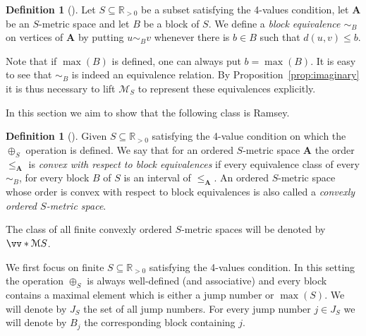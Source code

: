 \documentclass{elsarticle}
\def\ordclasssup#1#2{\vv*{#1}{#2}}
\def\str#1{\mathbf {#1}}
\theoremstyle{plain}
\theoremstyle{definition}
\newtheorem{definition}[theorem]{Definition}
\theoremstyle{remark}
\begin{document}
\begin{definition}[\cite{Sauer2012}]
Let $S\subseteq \mathbb R_{>0}$ be a subset satisfying the 4-values condition, let $\str{A}$ be an $S$-metric space and let $B$ be a block of $S$. We define a \emph{block equivalence $\sim_B$}
on vertices of $\str{A}$ by putting $u\sim_B v$ whenever there is $b\in B$ such that $d(u,v)\leq b$.
\end{definition}
Note that if $\max(B)$ is defined, one can always put $b=\max(B)$. It is easy to see that $\sim_B$ is indeed an equivalence relation. By Proposition~\ref{prop:imaginary}
it is thus necessary to lift $\mathcal{M}_S$ to represent these
equivalences explicitly.

In this section we aim to show that the following class is Ramsey.

\begin{definition}[\cite{The2010}]
\label{defn:Js}
Given $S\subseteq \mathbb R_{>0}$ satisfying the 4-value condition on which the $\oplus_S$ operation is defined.
We say that for an ordered $S$-metric space $\str A$ the order $\leq_\str{A}$ is \emph{convex with respect
to block equivalences} if every equivalence class of every $\sim_B$, for every block $B$ of $S$ is an interval of $\leq_\str{A}$.
An ordered $S$-metric space whose order is convex with respect to block equivalences is also called a \emph{convexly ordered $S$-metric space}.

The class of all finite convexly ordered $S$-metric spaces will be denoted by $\ordclasssup{\mathcal M}{S}$.
\end{definition}

We first focus on finite $S\subseteq \mathbb R_{>0}$ satisfying the 4-values
condition. In this setting the operation $\oplus_S$ is always well-defined (and associative) and
every block contains a maximal element which is either a jump number or
$\max(S)$. We will denote by $J_S$ the set of all jump numbers. For every jump number $j\in J_S$ we will denote by $B_j$ the corresponding block
containing $j$.
\end{document}
